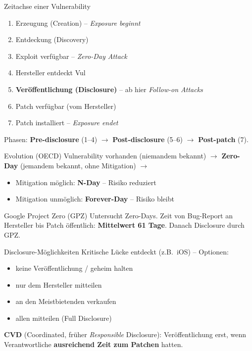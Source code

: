 \documentclass[a4paper, fontsize=7pt]{scrartcl}
\begin{document}
\begin{mainbox}{Zeitachse einer Vulnerability}
\begin{enumerate}
    \item Erzeugung (Creation) -- \emph{Exposure beginnt}
    \item Entdeckung (Discovery)
    \item Exploit verfügbar -- \emph{Zero-Day Attack}
    \item Hersteller entdeckt Vul
    \item \textbf{Veröffentlichung (Disclosure)} -- ab hier
          \emph{Follow-on Attacks}
    \item Patch verfügbar (vom Hersteller)
    \item Patch installiert -- \emph{Exposure endet}
\end{enumerate}
Phasen: \textbf{Pre-disclosure} (1--4) $\to$ \textbf{Post-disclosure}
(5--6) $\to$ \textbf{Post-patch} (7).
\end{mainbox}

\begin{mainbox}{Evolution (OECD)}
Vulnerability vorhanden (niemandem bekannt) $\to$ \textbf{Zero-Day}
(jemandem bekannt, ohne Mitigation) $\to$
\begin{itemize}
    \item Mitigation möglich: \textbf{N-Day} -- Risiko reduziert
    \item Mitigation unmöglich: \textbf{Forever-Day} -- Risiko bleibt
\end{itemize}
\end{mainbox}

\begin{subbox}{Google Project Zero (GPZ)}
Untersucht Zero-Days. Zeit von Bug-Report an Hersteller bis Patch
öffentlich: \textbf{Mittelwert 61 Tage}. Danach Disclosure durch GPZ.
\end{subbox}

\begin{mainbox}{Disclosure-Möglichkeiten}
Kritische Lücke entdeckt (z.B.\ iOS) -- Optionen:
\begin{itemize}
    \item keine Veröffentlichung / geheim halten
    \item nur dem Hersteller mitteilen
    \item an den Meistbietenden verkaufen
    \item allen mitteilen (Full Disclosure)
\end{itemize}
\textbf{CVD} (Coordinated, früher \emph{Responsible} Disclosure):
Veröffentlichung erst, wenn Verantwortliche \textbf{ausreichend Zeit
zum Patchen} hatten.
\end{mainbox}
\end{document}
